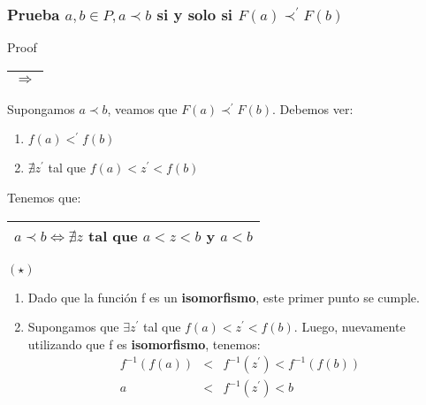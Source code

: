 \begin{frame}
	\frametitle{Prueba $a, b \in P, a \prec b$ si y solo si $F(a) \prec^{\prime} F(b)$}

	\begin{block}{Proof}
		\PN \begin{tabular}{|c|} \hline $\Rightarrow$ \\\hline \end{tabular} Supongamos $a \prec b$, veamos que $F(a)
		\prec^{\prime} F(b)$. Debemos ver:
	  \begin{enumerate}[1)]
	    \item $f(a) <^{\prime} f(b)$
	    \item $\nexists z^{\prime}$ tal que $f(a) < z^{\prime} < f(b)$
	  \end{enumerate}

		\vspace{2mm}
	  \PN Tenemos que:
		\begin{center}
			\begin{tabular}{|c|}
				\hline $a \prec b \Leftrightarrow \nexists z$ tal que $a < z < b$ y $a < b$ \\\hline
			\end{tabular} $(\star)$
		\end{center}

		\begin{enumerate}
	  	\item Dado que la función f es un \textbf{isomorfismo}, este primer punto se cumple.
			\item Supongamos que $\exists z^{\prime}$ tal que $f(a) < z^{\prime} < f(b)$. Luego, nuevamente utilizando que f
			es \textbf{isomorfismo}, tenemos:
			\begin{eqnarray*}
	  		f^{-1}(f(a)) &<& f^{-1}(z^{\prime}) < f^{-1}(f(b)) \\
				a &<& f^{-1}(z^{\prime}) < b
			\end{eqnarray*}
		\end{enumerate}
	\end{block}
\end{frame}
